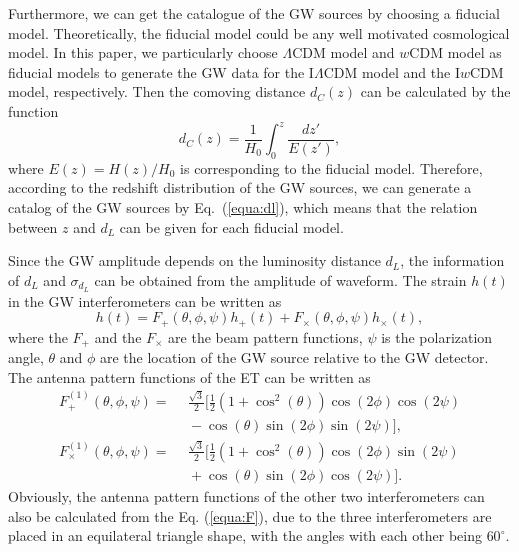 \documentclass[aps,prd,nofootinbib,amsmath,amssymb,superscriptaddress,twocolumn,10pt]{revtex4}%
\begin{document}
Furthermore, we can get the catalogue of the GW sources by choosing a fiducial model. Theoretically, the fiducial model could be any well motivated cosmological model. In this paper, we particularly choose $\Lambda$CDM model and $w$CDM model as fiducial models to generate the GW data for the I$\Lambda$CDM model and the I$w$CDM model, respectively. Then the comoving distance $d_C(z)$ can be calculated by the function
\begin{equation}
{d_C}(z) = \frac{{1}}{{H_0}}\int_0^z {\frac{{dz'}}{{E(z')}}},
\label{equa:dl}
\end{equation}
where $E(z)=H(z)/H_0$ is corresponding to the fiducial model. Therefore, according to the redshift distribution of the GW sources, we can generate a catalog of the GW sources by Eq.~(\ref{equa:dl}), which means that the relation between $z$ and $d_L$ can be given for each fiducial model.

Since the GW amplitude depends on the luminosity distance $d_L$, the information of $d_L$ and $\sigma_{d_L}$ can be obtained from the amplitude of waveform. The strain $h(t)$ in the GW interferometers can be written as
\begin{equation}
h(t)=F_+(\theta, \phi, \psi)h_+(t)+F_\times(\theta, \phi, \psi)h_\times(t),
\end{equation}
where the $F_{+}$ and the $F_{\times}$ are the beam pattern functions, $\psi$ is the polarization angle, $\theta$ and $\phi$ are the location of the GW source relative to the GW detector. The antenna pattern functions of the ET can be written as \cite{Zhao:2010sz}
 \begin{align}
F_+^{(1)}(\theta, \phi, \psi)=&~~\frac{{\sqrt 3 }}{2}[\frac{1}{2}(1 + {\cos ^2}(\theta ))\cos (2\phi )\cos (2\psi ) \nonumber\\
                              &~~- \cos (\theta )\sin (2\phi )\sin (2\psi )],\nonumber\\
F_\times^{(1)}(\theta, \phi, \psi)=&~~\frac{{\sqrt 3 }}{2}[\frac{1}{2}(1 + {\cos ^2}(\theta ))\cos (2\phi )\sin (2\psi ) \nonumber\\
                              &~~+ \cos (\theta )\sin (2\phi )\cos (2\psi )].
\label{equa:F}
\end{align}
Obviously, the antenna pattern functions of the other two interferometers can also be calculated from the Eq. (\ref{equa:F}), due to the three interferometers are placed in an equilateral triangle shape, with the angles with each other being $60^{\circ}$.
\end{document}

